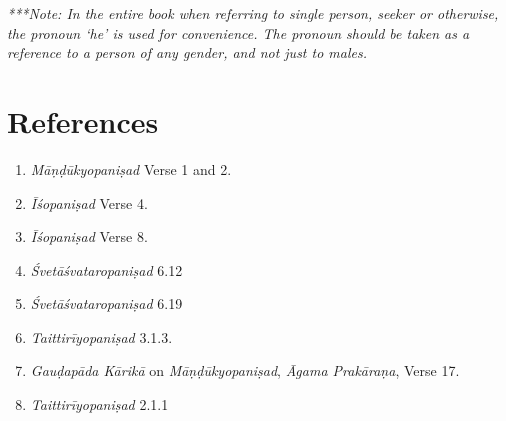 \emph{***Note: In the entire book when referring to single person, seeker or otherwise, the pronoun `he' is used for convenience. The pronoun should be taken as a reference to a person of any gender, and not just to males.}

\section*{References}

\begin{enumerate}
\itemsep=0pt
\item
	\emph{Māṇḍūkyopaniṣad} Verse 1 and 2.
\item
  \emph{Īśopaniṣad} Verse 4.
\item
  \emph{Īśopaniṣad} Verse 8.
\item
  \emph{Śvetāśvataropaniṣad} 6.12
\item
  \emph{Śvetāśvataropaniṣad} 6.19
\item
  \emph{Taittirīyopaniṣad} 3.1.3.
\item
  \emph{Gauḍapāda Kārikā} on \emph{Māṇḍūkyopaniṣad}, \emph{Āgama Prakāraṇa}, Verse 17.
\item
  \emph{Taittirīyopaniṣad} 2.1.1
\end{enumerate}
